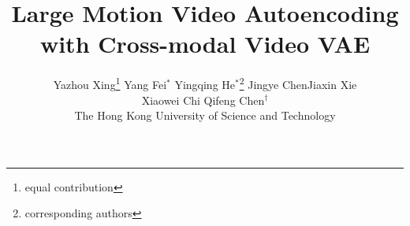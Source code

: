 \documentclass[10pt,twocolumn,letterpaper]{article}
\title{Large Motion Video Autoencoding with Cross-modal Video VAE}
\author{Yazhou Xing\thanks{equal contribution}  \quad Yang Fei$^{*}$ \quad Yingqing He$^{*}$\thanks{corresponding authors} \quad Jingye Chen\quad Jiaxin Xie \\ \quad Xiaowei Chi \quad Qifeng Chen$^{\dagger}$
\\
The Hong Kong University of Science and Technology
}
\begin{document}
\maketitle
    





{
    \small
    
    
}

% 
\end{document}
